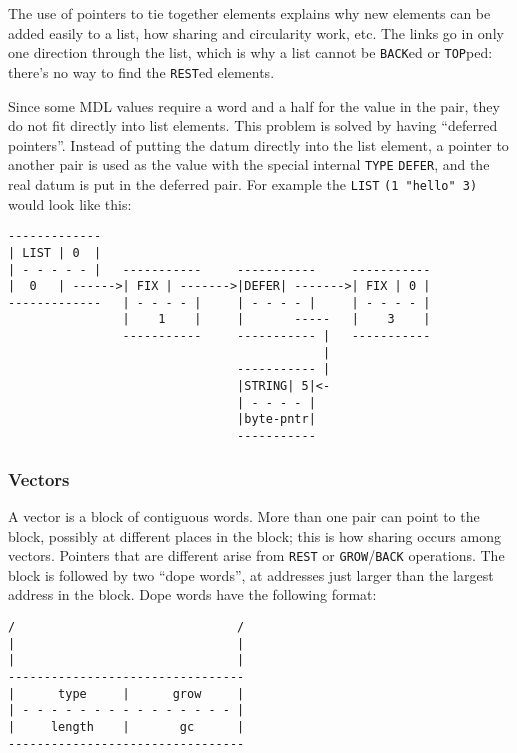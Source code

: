 \documentclass[a4paper]{scrbook}
\begin{document}
The use of pointers to tie together elements explains why new elements can be added easily to a list, how sharing and
circularity work, etc. The links go in only one direction through the list, which is why a list cannot be
\texttt{BACK}ed or \texttt{TOP}ped: there's no way to find the
\texttt{REST}ed elements.

Since some MDL values require a word and a half for the value in the pair, they do not fit directly into list elements.
This problem is solved by having ``deferred pointers''. Instead of putting the datum directly into the list element, a
pointer to another pair is used as the value with the special internal \texttt{TYPE} \texttt{DEFER}, and the real datum is
put in the deferred pair. For example the \texttt{LIST} \texttt{(1\ "hello"\ 3)} would look like this:

\begin{verbatim}
-------------
| LIST | 0  |
| - - - - - |   -----------     -----------     -----------
|  0   | ------>| FIX | ------->|DEFER| ------->| FIX | 0 |
-------------   | - - - - |     | - - - - |     | - - - - |
                |    1    |     |       -----   |    3    |
                -----------     ----------- |   -----------
                                            |
                                ----------- |
                                |STRING| 5|<-
                                | - - - - |
                                |byte-pntr|
                                -----------
\end{verbatim}

\subsubsection*{Vectors}\label{vectors}

A vector is a block of contiguous words. More than one pair can point to the block, possibly at different places in the
block; this is how sharing occurs among vectors. Pointers that are different arise from \texttt{REST} or
\texttt{GROW}/\texttt{BACK} operations. The block is followed by two ``dope words'', at addresses just larger than the
largest address in the block. Dope words have the following format:

\begin{verbatim}
/                               /
|                               |
|                               |
---------------------------------
|      type     |      grow     |
| - - - - - - - - - - - - - - - |
|     length    |       gc      |
---------------------------------
\end{verbatim}
\end{document}
